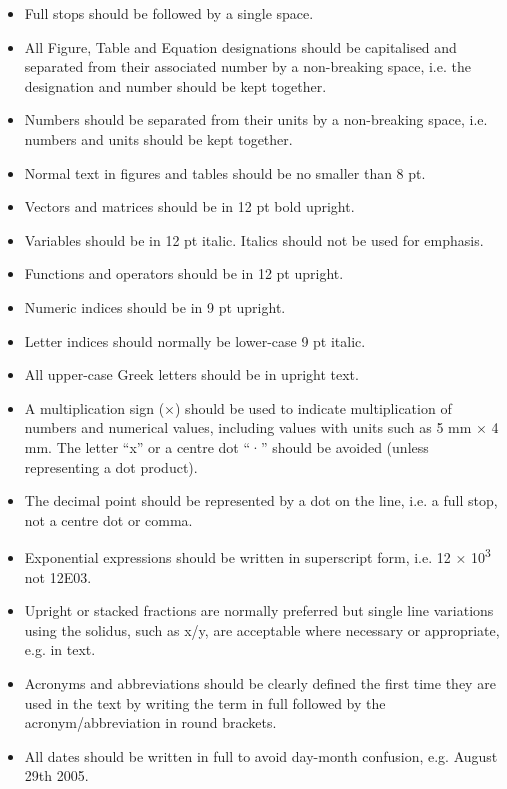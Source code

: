 \documentclass[12pt]{article}
\begin{document}
\begin{itemize}
\item
  Full stops should be followed by a single space.
\item
  All Figure, Table and Equation designations should be capitalised and
  separated from their associated number by a non-breaking space, i.e.
  the designation and number should be kept together.
\item
  Numbers should be separated from their units by a non-breaking space,
  i.e. numbers and units should be kept together.
\item
  Normal text in figures and tables should be no smaller than 8 pt.
\item
  Vectors and matrices should be in 12 pt bold upright.
\item
  Variables should be in 12 pt italic. Italics should not be used for
  emphasis.
\item
  Functions and operators should be in 12 pt upright.
\item
  Numeric indices should be in 9 pt upright.
\item
  Letter indices should normally be lower-case 9 pt italic.
\item
  All upper-case Greek letters should be in upright text.
\item
  A multiplication sign (×) should be used to indicate multiplication of
  numbers and numerical values, including values with units such as 5 mm
  × 4 mm. The letter ``x'' or a centre dot ``·'' should be avoided
  (unless representing a dot product).
\item
  The decimal point should be represented by a dot on the line, i.e. a
  full stop, not a centre dot or comma.
\item
  Exponential expressions should be written in superscript form, i.e. 12
  × 10\textsuperscript{3} not 12E03.
\item
  Upright or stacked fractions are normally preferred but single line
  variations using the solidus, such as x/y, are acceptable where
  necessary or appropriate, e.g. in text.
\item
  Acronyms and abbreviations should be clearly defined the first time
  they are used in the text by writing the term in full followed by the
  acronym/abbreviation in round brackets.
\item
  All dates should be written in full to avoid day-month confusion, e.g.
  August 29th 2005.
\end{itemize}
\end{document}
